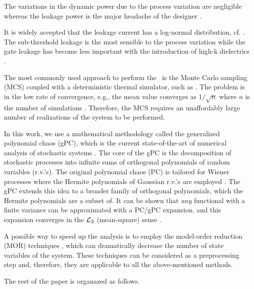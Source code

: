 The variations in the dynamic power due to the process variation are negligible whereas the leakage power is the major headache of the designer \cite{juan2012, srivastava2010}.

It is widely accepted that the leakage current has a log-normal distribution, cf. \cite{juan2012, srivastava2010}. The sub-threshold leakage is the most sensible to the process variation while the gate leakage has become less important with the introduction of high-k dielectrics \cite{juan2012}.

The most commonly used approach to perform the \sta\ is the Monte Carlo sampling (MCS) coupled with a deterministic thermal simulator, such as \cite{huang2006}. The problem is in the low rate of convergence, e.g., the mean value converges as $1/\sqrt{n}$ where $n$ is the number of simulations \cite{xiu2009}. Therefore, the MCS requires an unaffordably large number of realizations of the system to be performed.

In this work, we use a mathematical methodology called the generalized polynomial chaos (gPC), which is the current state-of-the-art of numerical analysis of stochastic systems \cite{xiu2002, xiu2009}. The core of the gPC is the decomposition of stochastic processes into infinite sums of orthogonal polynomials of random variables (r.v.'s). The original polynomial chaos (PC) is tailored for Wiener processes where the Hermite polynomials of Gaussian r.v.'s are employed \cite{ghanem1991}. The gPC extends this idea to a broader family of orthogonal polynomials, which the Hermite polynomials are a subset of. It can be shown that \emph{any} functional with a finite variance can be approximated with a PC/gPC expansion, and this expansion converges in the $\mathcal{L}_{2}$ (mean-square) sense \cite{ghanem1991}.

A possible way to speed up the analysis is to employ the model-order reduction (MOR) techniques \cite{benner2011}, which can dramatically decrease the number of state variables of the system. These techniques can be considered as a preprocessing step and, therefore, they are applicable to all the above-mentioned methods.

The rest of the paper is organazed as follows.
